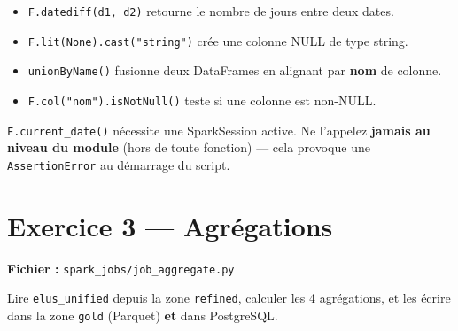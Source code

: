 \documentclass[11pt,a4paper]{article}
\begin{document}
\begin{hint}
\begin{itemize}[leftmargin=*]
  \item \texttt{F.datediff(d1, d2)} retourne le nombre de jours entre deux dates.
  \item \texttt{F.lit(None).cast("string")} crée une colonne NULL de type string.
  \item \texttt{unionByName()} fusionne deux DataFrames en alignant par \textbf{nom} de colonne.
  \item \texttt{F.col("nom").isNotNull()} teste si une colonne est non-NULL.
\end{itemize}
\end{hint}

\begin{attention}
\texttt{F.current\_date()} nécessite une SparkSession active. Ne l'appelez \textbf{jamais au niveau du module} (hors de toute fonction) — cela provoque une \texttt{AssertionError} au démarrage du script.
\end{attention}

\section{Exercice 3 — Agrégations}

\textbf{Fichier :} \texttt{spark\_jobs/job\_aggregate.py}

\begin{objectif}
Lire \texttt{elus\_unified} depuis la zone \texttt{refined}, calculer les 4 agrégations, et les écrire dans la zone \texttt{gold} (Parquet) \textbf{et} dans PostgreSQL.
\end{objectif}
\end{document}
